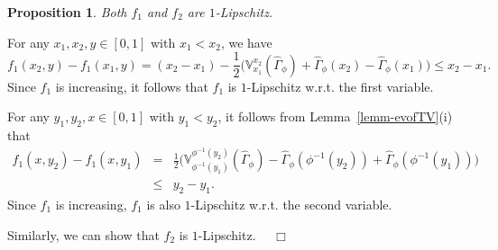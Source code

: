 \documentclass[12pt]{article}
\renewenvironment{proof}{\noindent{\bf Proof.}}{~~$\Box$}
\theoremstyle{plain}
\newtheorem{prot}[thrm]{Proposition}
\theoremstyle{definition}
\begin{document}
\begin{prot}\label{prot-lip}
Both $f_1$ and $f_2$ are $1$-Lipschitz.
\end{prot}
\begin{proof}
For any $x_1, x_2, y\in[0, 1]$ with $x_1<x_2$, we have
\[
f_1(x_2, y)-f_1(x_1, y)=(x_2-x_1)-\frac{1}{2}\Big(\mathbb{V}_{x_1}^{x_2}(\hat{\Gamma}_\phi)+\hat{\Gamma}_\phi(x_2)-\hat{\Gamma}_\phi(x_1)\Big)\leq x_2-x_1.
\]
Since $f_1$ is increasing, it follows that $f_1$ is $1$-Lipschitz w.r.t. the first variable.

For any $y_1, y_2, x\in[0, 1]$ with $y_1<y_2$, it follows from Lemma~\ref{lemm-evofTV}(i) that
\begin{eqnarray*}
f_1(x, y_2)-f_1(x, y_1)
&=&\frac{1}{2}\Big(\mathbb{V}_{\phi^{-1}(y_1)}^{\phi^{-1}(y_2)}(\hat{\Gamma}_\phi)-\hat{\Gamma}_\phi(\phi^{-1}(y_2))+\hat{\Gamma}_\phi(\phi^{-1}(y_1))\Big)\\
&\leq& y_2-y_1.
\end{eqnarray*}
Since $f_1$ is increasing, $f_1$ is also $1$-Lipschitz w.r.t. the second variable.

Similarly, we can show that $f_2$ is $1$-Lipschitz.
\end{proof}
\end{document}
